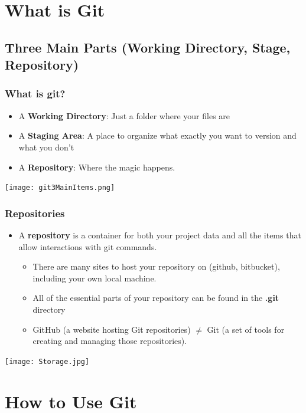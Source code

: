 \documentclass{beamer}
\begin{document}
\section{What is Git}

\subsection{Three Main Parts (Working Directory, Stage, Repository)}

\begin{frame}[fragile]
\frametitle{What is git?}
\begin{itemize}
\item A \textbf{Working Directory}: Just a folder where your files are
\item A \textbf{Staging Area}: A place to organize what exactly you want to version and what you don't
\item A \textbf{Repository}: Where the magic happens. 
\end{itemize}
\texttt{[image: git3MainItems.png]}
\end{frame}

\begin{frame}[fragile]
\frametitle{Repositories}
\begin{itemize}
\item A \textbf{repository} is a container for both your project data and all the items that allow interactions with git commands.
\begin{itemize}
\item There are many sites to host your repository on (github, bitbucket), including your own local machine.
\item All of the essential parts of your repository can be found in the \textbf{.git} directory
\item GitHub (a website hosting Git repositories) $\neq$ Git (a set of tools for creating and managing those repositories).
\end{itemize}
\end{itemize}
\texttt{[image: Storage.jpg]}
\end{frame}

\section{How to Use Git}
\end{document}
